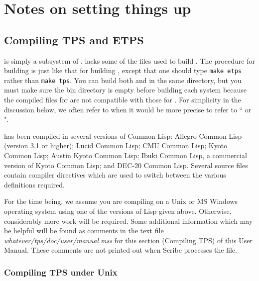 \chapter{Notes on setting things up}\label{set-up}
\section{Compiling TPS and ETPS}

{\ETPS} is simply a subsystem of {\TPS}.  {\ETPS} lacks some
of the files used to build {\TPS}.
The procedure for building {\ETPS} is just like that for
building {\TPS}, except that one should type {\tt make etps}
rather than {\tt make tps}.  You can build both {\TPS} and {\ETPS}
in the same directory, but you must
make sure the bin directory is empty before building
each system because the compiled files for
{\TPS} are not compatible with those for {\ETPS}.
For simplicity in the discussion below,
we often refer to {\TPS} when it would be more precise
to refer to ``{\TPS} or {\ETPS}".

{\TPS} has been compiled in several versions of Common Lisp: Allegro
Common Lisp (version 3.1 or higher); Lucid Common Lisp; CMU Common
Lisp; Kyoto Common Lisp; Austin Kyoto Common Lisp; Ibuki Common Lisp,
a commercial version of Kyoto Common Lisp; and DEC-20 Common Lisp.
  Several source files contain
compiler directives which are used to switch between the various
definitions required.

For the time being, we assume you are compiling on a Unix
or MS Windows operating system
using one of the versions of Lisp given above.
Otherwise, considerably more work will be required.  Some additional information
which may be helpful will be found as comments in the text file
{\it whatever/tps/doc/user/manual.mss} for this section (Compiling TPS) of
this User Manual.  These comments are not printed out when Scribe
processes the file.

\subsection{Compiling TPS under Unix}\label{set-up-unix}

